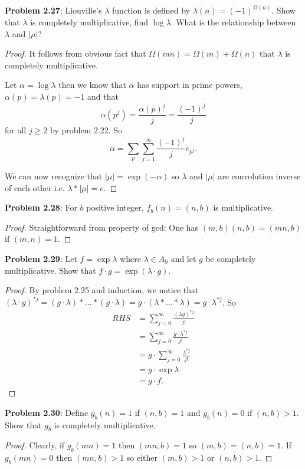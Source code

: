 \documentclass{article}
\begin{document}
\textbf{Problem 2.27}: Liouville's $\lambda$ function is defined by $\lambda(n) = (-1)^{\Omega(n)}$. Show that $\lambda$ is completely multiplicative, find $\log \lambda$. What is the relationship between $\lambda$ and $|\mu|$?

\begin{proof}
It follows from obvious fact that $\Omega(mn) = \Omega(m) + \Omega(n)$ that $\lambda$ is completely multiplicative.

Let $\alpha = \log \lambda$ then we know that $\alpha$ has support in prime powers, $\alpha(p) = \lambda(p) = -1$ and that
$$\alpha(p^j) = \frac{\alpha(p)^j}{j} = \frac{(-1)^j}{j}$$
for all $j \geq 2$ by problem 2.22. So
$$\alpha = \sum_p \sum_{j = 1}^{\infty} \frac{(-1)^j}{j} e_{p^j}.$$

We can now recognize that $|\mu| = \exp(-\alpha)$ so $\lambda$ and $|\mu|$ are convolution inverse of each other i.e. $\lambda * |\mu| = e$.
\end{proof}

\textbf{Problem 2.28}: For $b$ positive integer, $f_b(n) = (n, b)$ is multiplicative.

\begin{proof}
Straightforward from property of gcd: One has $(m, b) (n, b) = (mn, b)$ if $(m, n) = 1$.
\end{proof}

\textbf{Problem 2.29}: Let $f = \exp \lambda$ where $\lambda \in A_0$ and let $g$ be completely multiplicative. Show that $f \cdot g = \exp(\lambda \cdot g)$.

\begin{proof}
By problem 2.25 and induction, we notice that $(\lambda \cdot g)^{*j} = (g \cdot \lambda) * ... * (g \cdot \lambda) = g \cdot (\lambda * ... * \lambda) = g \cdot \lambda^{*j}$. So
\begin{align*}
RHS &= \sum_{j=0}^{\infty} \frac{(\lambda g)^{*j}}{j!}\\
&= \sum_{j=0}^{\infty} \frac{g \cdot \lambda^{*j}}{j!}\\
&= g \cdot \sum_{j=0}^{\infty} \frac{\lambda^{*j}}{j!}\\
&= g \cdot \exp \lambda\\
&= g \cdot f.
\end{align*}
\end{proof}

\textbf{Problem 2.30}: Define $g_b(n) = 1$ if $(n, b) = 1$ and $g_b(n) = 0$ if $(n, b) > 1$. Show that $g_b$ is completely multiplicative.

\begin{proof}
Clearly, if $g_b(mn) = 1$ then $(mn, b) = 1$ so $(m, b) = (n, b) = 1$. If $g_b(mn) = 0$ then $(mn, b) > 1$ so either $(m, b) > 1$ or $(n, b) > 1$.
\end{proof}
\end{document}
